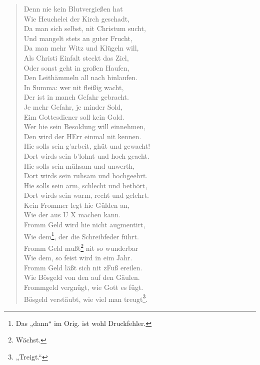 \begin{verse}
Denn nie kein Blutvergießen hat\\
Wie Heuchelei der Kirch geschadt,\\
Da man sich selbst, nit Christum sucht,\\
Und mangelt stets an guter Frucht,\\
Da man mehr Witz und Klügeln will,\\
Als Christi Einfalt steckt das Ziel,\\
Oder sonst geht in großen Haufen,\\
Den Leithämmeln all nach hinlaufen.\\
In Summa: wer nit fleißig wacht,\\
Der ist in manch Gefahr gebracht.\\
Je mehr Gefahr, je minder Sold,\\
Eim Gottesdiener soll kein Gold.\\
Wer hie sein Besoldung will einnehmen,\\
Den wird der HErr einmal nit kennen.\\
Hie solls sein g’arbeit, ghüt und gewacht!\\
Dort wirds sein b’lohnt und hoch geacht.\\
Hie solls sein mühsam und unwerth,\\
Dort wirds sein ruhsam und hochgeehrt.\\
Hie solls sein arm, schlecht und bethört,\\
Dort wirds sein warm, recht und gelehrt.\\
Kein Frommer legt hie Gülden an,\\
Wie der aus U X machen kann.\\
Fromm Geld wird hie nicht augmentirt,\\
Wie dem\footnote{Das „dann“ im Orig. ist wohl Druckfehler.}, der die Schreibfeder führt.\\
Fromm Geld mußt\footnote{Wächst.} nit so wunderbar\\
Wie dem, so feist wird in eim Jahr.\\
Fromm Geld läßt sich nit zFuß ereilen.\\
Wie Bösgeld von den auf den Gäulen.\\
Frommgeld vergnügt, wie Gott es fügt.\\
Bösgeld verstäubt, wie viel man treugt\footnote{„Treigt.“}.
\end{verse}

